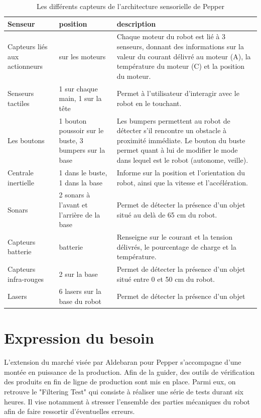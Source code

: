 \begin{table}[h]
	\begin{tabular}{ | p{3cm} | p{4cm} | p{7cm} | }
		\hline
		Senseur & position & description \\
		\hline
		Capteurs liés aux actionneurs & sur les moteurs & Chaque moteur du robot est lié à 3 senseurs, donnant des informations sur la valeur du courant délivré au moteur (A), la température du moteur (C) et la position du moteur. \\
		\hline
		Senseurs tactiles & 1 sur chaque main, 1 sur la tête & Permet à l'utilisateur d'interagir avec le robot en le touchant.	\\	
		\hline 
		Les boutons & 1 bouton poussoir sur le buste, 3 bumpers sur la base & Les bumpers permettent au robot de détecter s'il rencontre un obstacle à proximité immédiate. Le bouton du buste permet quant à lui de modifier le mode dans lequel est le robot (autonome, veille). \\
		\hline 
		Centrale inertielle & 1 dans le buste, 1 dans la base & Informe sur la position et l'orientation du robot, ainsi que la vitesse et l'accélération. \\
		\hline
		Sonars & 2 sonars à l'avant et l'arrière de la base & Permet de détecter la présence d'un objet situé au delà de 65 cm du robot. \\
		\hline 
		Capteurs batterie & batterie & Renseigne sur le courant et la tension délivrés, le pourcentage de charge et la température. \\
		\hline
		Capteurs infra-rouges & 2 sur la base &  Permet de détecter la présence d'un objet situé entre 0 et 50 cm du robot. \\
		\hline
		Lasers & 6 lasers sur la base du robot & Permet de détecter la présence d'un objet \\
		\hline 
	\end{tabular}
	\caption[Les différents capteurs de Pepper]{Les différents capteurs de l'architecture sensorielle de Pepper}
	\label {tab: Les différents capteurs de Pepper}
\end{table}


\section{Expression du besoin}
\label{Introduction:Expression du besoin}
L'extension du marché visée par Aldebaran pour Pepper s'accompagne d'une montée en puissance de la production. Afin de la guider, des outils de vérification des produits en fin de ligne de production sont mis en place. Parmi eux, on retrouve le "Filtering Test" qui consiste à réaliser une série de tests durant six heures. Il vise notamment à stresser l'ensemble des parties mécaniques du robot afin de faire ressortir d'éventuelles erreurs.

